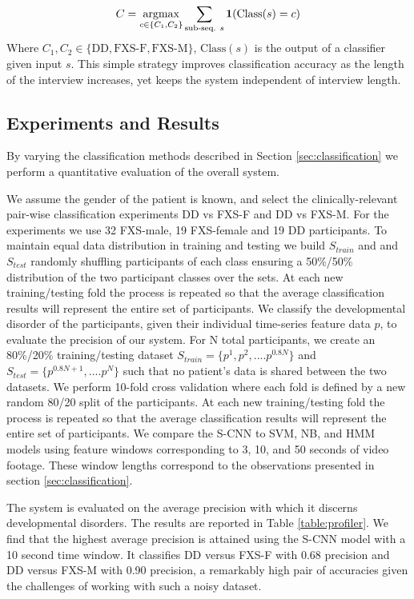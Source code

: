 \documentclass[10pt,twocolumn,letterpaper]{article}
\begin{document}
\begin{equation}
C = \underset{c \in \{C_1, C_2\}} {\operatorname{argmax}} \sum_{\text{sub-seq. } s}^{} \bold{1}(\text{Class}(s) = c)
\end{equation}
Where $C_1, C_2 \in \{\text{DD}, \text{FXS-F}, \text{FXS-M}\}$, $\text{Class}(s)$ is the output of a classifier given input $s$. This simple strategy improves classification accuracy as the length of the interview increases, yet keeps the system independent of interview length.

\subsection{Experiments and Results}

By varying the classification methods described in Section \ref{sec:classification} we perform a quantitative evaluation of the overall system.

We assume the gender of the patient is known, and select the clinically-relevant pair-wise classification experiments DD vs FXS-F and DD vs FXS-M. For the experiments we use 32 FXS-male, 19 FXS-female and 19 DD participants. To maintain equal data distribution in training and testing we build $S_{train}$ and and $S_{test}$ randomly shuffling participants of each class ensuring a 50\%/50\% distribution of the two participant classes over the sets. At each new training/testing fold the process is repeated so that the average classification results will represent the entire set of participants. We classify the developmental disorder of the participants, given their individual time-series feature data $p$, to evaluate the precision of our system. For N total participants, we create an 80\%/20\% training/testing dataset $S_{train} = \{ p^1, p^2, .... p^{0.8 N} \}$ and $S_{test} = \{ p^{0.8N + 1}, .... p^N \}$  such that no patient's data is shared between the two datasets. We perform 10-fold cross validation where each fold is defined by a new random 80/20 split of the participants. At each new training/testing fold the process is repeated so that the average classification results will represent the entire set of participants. We compare the S-CNN to SVM, NB, and HMM models using feature windows corresponding to 3, 10, and 50 seconds of video footage. These window lengths correspond to the observations presented in section \ref{sec:classification}.

The system is evaluated on the average precision with which it discerns developmental disorders. The results are reported in Table  \ref{table:profiler}. We find that the highest average precision is attained using the S-CNN model with a 10 second time window. It classifies DD versus FXS-F with 0.68 precision and DD versus FXS-M with 0.90 precision, a remarkably high pair of accuracies given the challenges of working with such a noisy dataset. 
\end{document}
